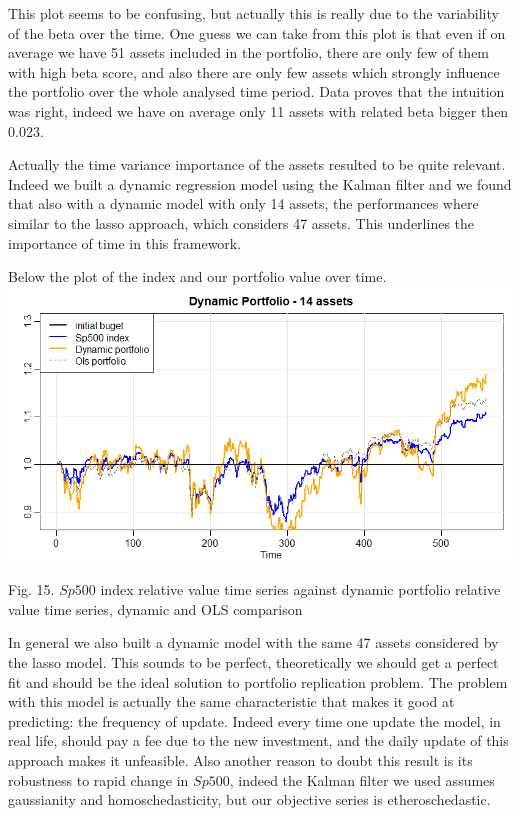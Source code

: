 \documentclass{article}%
\begin{document}
This plot seems to be confusing, but actually this is really due to the variability of the beta over the time. One guess we can take from this plot is that even if on average we have 51 assets included in the portfolio, there are only few of them with high beta score, and also there are only few assets which strongly influence the portfolio over the whole analysed time period. Data proves that the intuition was right, indeed we have on average only 11 assets with related beta bigger then 0.023. 

Actually the time variance importance of the assets resulted to be quite relevant. Indeed we built a dynamic regression model using the Kalman filter and we found that also with a dynamic model with only 14 assets, the performances where similar to the lasso approach, which considers 47 assets. This underlines the importance of time in this framework.

Below the plot of the index and our portfolio value over time.
\\

\includegraphics[scale=0.55]{dynamic14}
\begin{center}
\begin{small}
Fig. 15. $Sp500$ index relative value time series against dynamic portfolio relative value time series, dynamic and OLS comparison
\\

\end{small}
\end{center}


In general we also built a dynamic model with the same 47 assets considered by the lasso model. This sounds to be perfect, theoretically we should get a perfect fit and should be the ideal solution to portfolio replication problem. The problem with this model is actually the same characteristic that makes it good at predicting: the frequency of update. Indeed every time one update the model, in real life, should pay a fee due to the new investment, and the daily update of this approach makes it unfeasible. Also another reason to doubt this result is its robustness to rapid change in $Sp500$, indeed the Kalman filter we used assumes gaussianity and homoschedasticity, but our objective series is etheroschedastic.  
\end{document}
